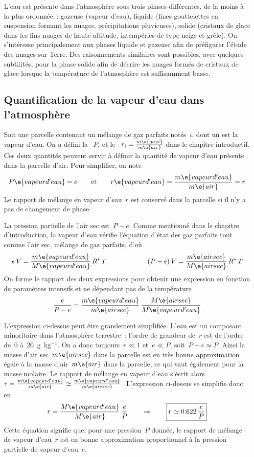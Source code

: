 \sk
L'eau est présente dans l'atmosphère sous trois phases différentes, de la moins à la plus ordonnée~: gazeuse (vapeur d'eau), liquide (fines gouttelettes en suspension formant les nuages, précipitations pluvieuses), solide (cristaux de glace dans les fins nuages de haute altitude, intempéries de type neige et grêle). On s'intéresse principalement aux phases liquide et gazeuse afin de préfigurer l'étude des nuages sur Terre. Des raisonnements similaires sont possibles, avec quelques subtilités, pour la phase solide afin de décrire les nuages formés de cristaux de glace lorsque la température de l'atmosphère est suffisamment basse.

\sk
\subsection{Quantification de la vapeur d'eau dans l'atmosphère}\label{rappmel}

\sk
Soit une parcelle contenant un mélange de gaz parfaits notés~$i$, dont un est la vapeur d'eau. On a défini la ~$P_i$ et le ~$r_i = \frac{m\e{gaz i}}{m\e{air}}$ dans le chapitre introductif. Ces deux quantités peuvent servir à définir la quantité de vapeur d'eau présente dans la parcelle d'air. Pour simplifier, on note
\[ P\e{vapeur d'eau} = e \qquad \text{et} \qquad r\e{vapeur d'eau} = \frac{m\e{vapeur d'eau}}{m\e{air}} = r \] 
Le rapport de mélange en vapeur d'eau~$r$ est conservé dans la parcelle si il n'y a pas de changement de phase.

\sk
La pression partielle de l'air sec est~$P - e$. Comme mentionné dans le chapitre d'introduction, la vapeur d'eau vérifie l'équation d'état des gaz parfaits tout comme l'air sec, mélange de gaz parfaits, d'où
\[  e \, V = \frac{m\e{vapeur d'eau}}{M\e{vapeur d'eau}} \, R^* \, T  \qquad \qquad \qquad (P-e) \, V = \frac{m\e{air sec}}{M\e{air sec}} \, R^* \, T  \]
On forme le rapport des deux expressions pour obtenir une expression en fonction de paramètres intensifs et ne dépendant pas de la température
\[ \frac{e}{P-e} = \frac{m\e{vapeur d'eau}}{m\e{air sec}} \, \frac{M\e{air sec}}{M\e{vapeur d'eau}} \]

\sk
L'expression ci-dessus peut être grandement simplifiée. L'eau est un composant minoritaire dans l'atmosphère terrestre~: l'ordre de grandeur de~$r$ est de l'ordre de~$0$ à~$20$~g~kg$^{-1}$. On a donc toujours~$r \ll 1$ et~$e \ll P$, soit~$P-e \simeq P$. Ainsi la masse d'air sec~$m\e{air sec}$ dans la parcelle est en très bonne approximation égale à la masse d'air~$m\e{air}$ dans la parcelle, ce qui vaut également pour la masse molaire. Le rapport de mélange en vapeur d'eau s'écrit alors~$r = \frac{m\e{vapeur d'eau}}{m\e{air}} \simeq \frac{m\e{vapeur d'eau}}{m\e{air sec}}$. L'expression ci-dessus se simplifie donc en
\[ r = \frac{M\e{vapeur d'eau}}{M\e{air}} \, \frac{e}{P} \qquad \Rightarrow \qquad \boxed{ r \simeq 0.622 \, \frac{e}{P} } \]
Cette équation signifie que, pour une pression~$P$ donnée, le rapport de mélange de vapeur d'eau~$r$ est en bonne approximation proportionnel à la pression partielle de vapeur d'eau~$e$.

